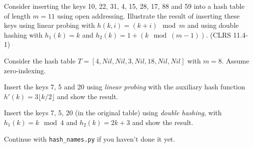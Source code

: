 \documentclass{article}
\begin{document}
\thispagestyle{fancy}

\begin{Exercise}[title={Simple training exercises}]
    \Question
    Consider inserting the keys 10, 22, 31, 4, 15, 28, 17, 88 and 59 into a hash
    table of length $m=11$ using open addressing. Illustrate the result of
    inserting these keys using linear probing with $h(k,i) = (k+i) \mod m$ and
    using double hashing with $h_1(k) = k$ and $h_2(k) = 1 + (k \mod (m-1))$.
    (CLRS 11.4-1)

\end{Exercise}

\begin{Exercise}[title={Exam question from 2024}]
    
    \noindent
    Consider the hash table $T = [4, Nil, Nil, 3, Nil, 18, Nil, Nil]$ with $m =
    8$. Assume zero-indexing.

    \Question
    Insert the keys 7, 5 and 20 using \textit{linear probing} with the auxiliary
    hash function $h'(k) = 3\lfloor k/2 \rfloor$ and show the result.

    \Question
    Insert the keys 7, 5, 20 (in the original table) using \textit{double
    hashing}, with $h_1(k)=k \mod 4$ and $h_2(k)= 2k + 3$ and show the result. 

\end{Exercise}

\begin{Exercise}[title={Fun creative exercises!}]
    Continue with \texttt{hash\_names.py} if you haven't done it yet.
\end{Exercise}
\end{document}
